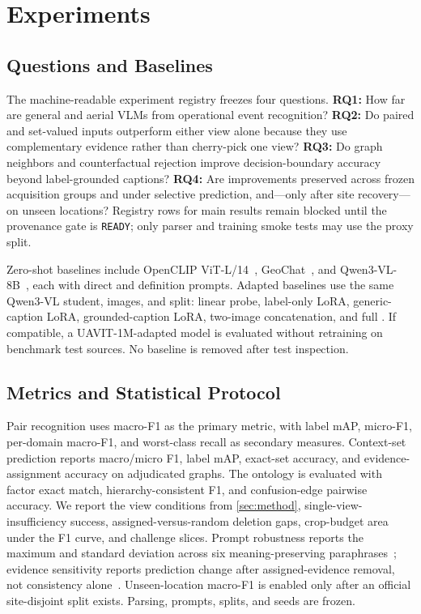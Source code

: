 \section{Experiments}
\label{sec:experiments}

\subsection{Questions and Baselines}

The machine-readable experiment registry freezes four questions. \textbf{RQ1:} How far are general and aerial VLMs from operational event recognition? \textbf{RQ2:} Do paired and set-valued inputs outperform either view alone because they use complementary evidence rather than cherry-pick one view? \textbf{RQ3:} Do graph neighbors and counterfactual rejection improve decision-boundary accuracy beyond label-grounded captions? \textbf{RQ4:} Are improvements preserved across frozen acquisition groups and under selective prediction, and---only after site recovery---on unseen locations? Registry rows for main results remain blocked until the provenance gate is \texttt{READY}; only parser and training smoke tests may use the proxy split.

Zero-shot baselines include OpenCLIP ViT-L/14~\cite{radford2021clip}, GeoChat~\cite{kuckreja2024geochat}, and Qwen3-VL-8B~\cite{bai2025qwen3vl}, each with direct and definition prompts. Adapted baselines use the same Qwen3-VL student, images, and split: linear probe, label-only LoRA, generic-caption LoRA, grounded-caption LoRA, two-image concatenation, and full \method. If compatible, a UAVIT-1M-adapted model is evaluated without retraining on benchmark test sources. No baseline is removed after test inspection.

\subsection{Metrics and Statistical Protocol}

Pair recognition uses macro-F1 as the primary metric, with label mAP, micro-F1, per-domain macro-F1, and worst-class recall as secondary measures. Context-set prediction reports macro/micro F1, label mAP, exact-set accuracy, and evidence-assignment accuracy on adjudicated graphs. The ontology is evaluated with factor exact match, hierarchy-consistent F1, and confusion-edge pairwise accuracy. We report the view conditions from \cref{sec:method}, single-view-insufficiency success, assigned-versus-random deletion gaps, crop-budget area under the F1 curve, and challenge slices. Prompt robustness reports the maximum and standard deviation across six meaning-preserving paraphrases~\cite{mahadev2026pinpoint}; evidence sensitivity reports prediction change after assigned-evidence removal, not consistency alone~\cite{bhat2026viewdiag}. Unseen-location macro-F1 is enabled only after an official site-disjoint split exists. Parsing, prompts, splits, and seeds are frozen.

